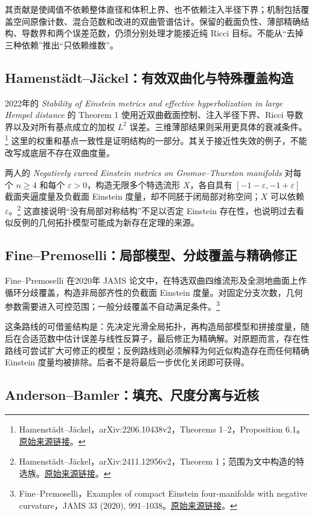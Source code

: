 \documentclass[11pt,a4paper]{article}
\theoremstyle{definition}
\newcommand{\src}[3]{\footnote{\raggedright #1，#2。\href{#3}{原始来源链接}。}}
\begin{document}
其贡献是使阈值不依赖整体直径和体积上界、也不依赖注入半径下界；机制包括覆盖空间原像计数、混合范数和改进的双曲管谱估计。保留的截面负性、薄部精确结构、导数界和两个误差范数，仍须分别处理才能接近纯 Ricci 目标。不能从“去掉三种依赖”推出“只依赖维数”。

\subsection{Hamenstädt--Jäckel：有效双曲化与特殊覆盖构造}

2022年的 \emph{Stability of Einstein metrics and effective hyperbolization in large Hempel distance} 的 Theorem 1 使用近双曲截面控制、注入半径下界、Ricci 导数界以及对所有基点成立的加权 $L^2$ 误差。三维薄部结果则采用更具体的衰减条件。\src{Hamenstädt--Jäckel}{arXiv:2206.10438v2，Theorems 1--2，Proposition 6.1}{https://arxiv.org/abs/2206.10438v2}
这里的权重和基点一致性是证明结构的一部分。其关于接近性失效的例子，不能改写成底层不存在双曲度量。

两人的 \emph{Negatively curved Einstein metrics on Gromov--Thurston manifolds} 对每个 $n\ge4$ 和每个 $\varepsilon>0$，构造无限多个特选流形 $X$，各自具有 $[-1-\varepsilon,-1+\varepsilon]$ 截面夹逼度量及负截面 Einstein 度量，却不同胚于闭局部对称空间；$X$ 可以依赖 $\varepsilon$。\src{Hamenstädt--Jäckel}{arXiv:2411.12956v2，Theorem 1；范围为文中构造的特选族}{https://arxiv.org/html/2411.12956v2}
这直接说明“没有局部对称结构”不足以否定 Einstein 存在性，也说明过去看似反例的几何拓扑模型可能成为新存在定理的来源。

\subsection{Fine--Premoselli：局部模型、分歧覆盖与精确修正}

Fine--Premoselli 在2020年 JAMS 论文中，在特选双曲四维流形及全测地曲面上作循环分歧覆盖，构造非局部齐性的负截面 Einstein 度量。对固定分支次数，几何参数需要进入可控范围；一般分歧覆盖不自动满足条件。\src{Fine--Premoselli}{Examples of compact Einstein four-manifolds with negative curvature，JAMS 33 (2020), 991--1038}{https://arxiv.org/abs/1802.00608}

这条路线的可借鉴结构是：先决定光滑全局拓扑，再构造局部模型和拼接度量，随后在合适范数中估计误差与线性反算子，最后修正为精确解。对原题而言，存在性路线可尝试扩大可修正的模型；反例路线则必须解释为何近似构造存在而任何精确 Einstein 度量均被排除。后者不是将最后一步优化关闭即可获得。

\subsection{Anderson--Bamler：填充、尺度分离与近核}
\end{document}
